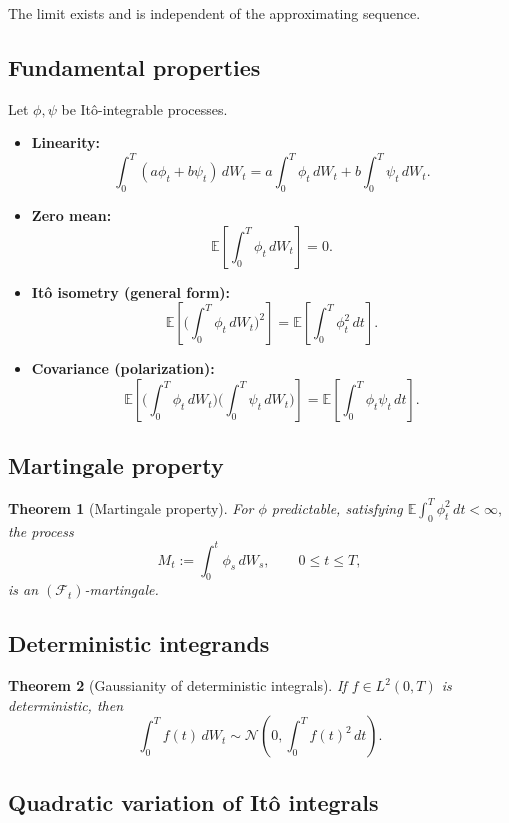 \documentclass[11pt]{article}
\newcommand{\E}{\mathbb{E}}
\newcommand{\1}{\mathbf{1}}
\theoremstyle{plain}
\newtheorem{theorem}{Theorem}[section]
\theoremstyle{definition}
\theoremstyle{remark}
\begin{document}
The limit exists and is independent of the approximating sequence.

\subsection{Fundamental properties}

Let $\phi,\psi$ be Itô-integrable processes.

\begin{itemize}
\item \textbf{Linearity:}
\[
\int_0^T (a\phi_t+b\psi_t)\,dW_t
=
a\int_0^T \phi_t\,dW_t
+
b\int_0^T \psi_t\,dW_t.
\]

\item \textbf{Zero mean:}
\[
\E\!\left[\int_0^T \phi_t\,dW_t\right]=0.
\]

\item \textbf{Itô isometry (general form):}
\[
\E\!\left[\Big(\int_0^T \phi_t\,dW_t\Big)^2\right]
=
\E\!\left[\int_0^T \phi_t^2\,dt\right].
\]

\item \textbf{Covariance (polarization):}
\[
\E\!\left[\Big(\int_0^T \phi_t\,dW_t\Big)
\Big(\int_0^T \psi_t\,dW_t\Big)\right]
=
\E\!\left[\int_0^T \phi_t\psi_t\,dt\right].
\]
\end{itemize}

\subsection{Martingale property}

\begin{theorem}[Martingale property]
For $\phi$ predictable, satisfying
\(
\E\int_0^T \phi_t^2\,dt < \infty,
\) the process
\[
M_t := \int_0^t \phi_s\,dW_s,
\qquad 0\le t\le T,
\]
is an $(\mathcal F_t)$-martingale.
\end{theorem}

\subsection{Deterministic integrands}

\begin{theorem}[Gaussianity of deterministic integrals]
If $f\in L^2(0,T)$ is deterministic, then
\[
\int_0^T f(t)\,dW_t
\sim
\mathcal N\!\left(0,\int_0^T f(t)^2\,dt\right).
\]
\end{theorem}

\subsection{Quadratic variation of Itô integrals}
\end{document}

